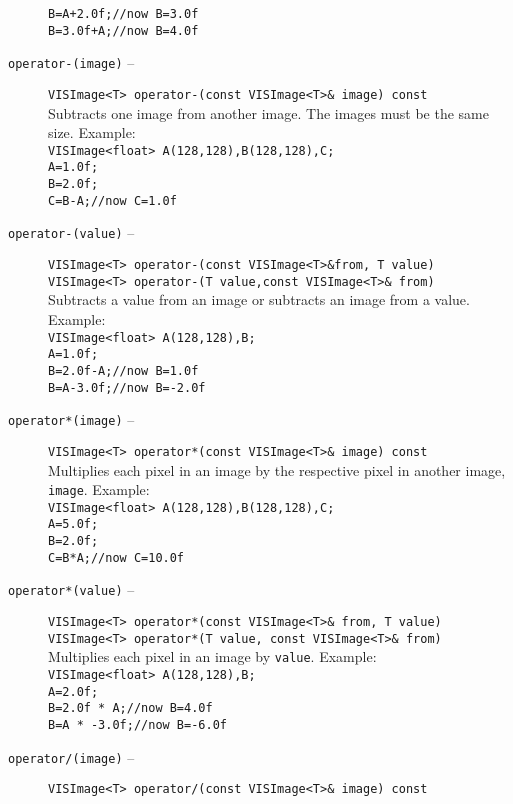 \begin{description}
{\tt B=A+2.0f;//now B=3.0f}\\
{\tt B=3.0f+A;//now B=4.0f}
\item[{\tt operator-(image)} --]
{\tt VISImage<T> operator-(const VISImage<T>\& image) const}\\
Subtracts one image from another image.
The images must be the same size.  Example:\\
{\tt VISImage<float> A(128,128),B(128,128),C;}\\
{\tt A=1.0f;}\\
{\tt B=2.0f;}\\
{\tt C=B-A;//now C=1.0f}
\item[{\tt operator-(value)} --]
{\tt VISImage<T> operator-(const VISImage<T>\&from, T value)}\\
{\tt VISImage<T> operator-(T value,const VISImage<T>\& from)}\\
Subtracts a value from an image or subtracts an image from a value.
Example:\\
{\tt VISImage<float> A(128,128),B;}\\
{\tt A=1.0f;}\\
{\tt B=2.0f-A;//now B=1.0f}\\
{\tt B=A-3.0f;//now B=-2.0f}
\item[{\tt operator*(image)} --]
{\tt VISImage<T> operator*(const VISImage<T>\& image) const}\\
Multiplies each pixel in an image by the respective pixel in another image,
{\tt image}.  Example:\\
{\tt VISImage<float> A(128,128),B(128,128),C;}\\
{\tt A=5.0f;}\\
{\tt B=2.0f;}\\
{\tt C=B*A;//now C=10.0f}
\item[{\tt operator*(value)} --]
{\tt VISImage<T> operator*(const VISImage<T>\& from, T value)}\\
{\tt VISImage<T> operator*(T value, const VISImage<T>\& from)}\\
Multiplies each pixel in an image by {\tt value}.
Example:\\
{\tt VISImage<float> A(128,128),B;}\\
{\tt A=2.0f;}\\
{\tt B=2.0f * A;//now B=4.0f}\\
{\tt B=A * -3.0f;//now B=-6.0f}
\item[{\tt operator/(image)} --]
{\tt VISImage<T> operator/(const VISImage<T>\& image) const}\\

\end{description}
